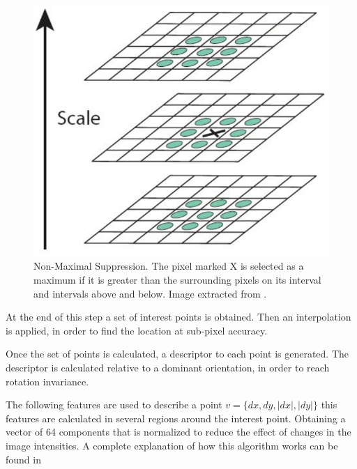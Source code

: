 \begin{figure}[H]
\begin{center}
\includegraphics[scale=0.28]{images/surf_nb}
\caption{Non-Maximal Suppression. The pixel marked X is selected as a maximum if it is greater than the 
surrounding pixels on its interval and intervals above and below. Image extracted from \cite{OpenSURF}.}
\end{center}
\end{figure}

At the end of this step a set of interest points is obtained. Then an interpolation is applied, in order to find the location 
at sub-pixel accuracy.

Once the set of points is calculated, a descriptor to each point is generated. The descriptor is calculated relative to a dominant 
orientation, in order to reach rotation invariance.
 
The following features are used to describe a point $v=\{dx,dy,|dx|,|dy|\}$ this features are calculated in several regions 
around the interest point. Obtaining a vector of 64 components that is normalized to reduce the effect of changes in the image 
intensities. A complete explanation of how this algorithm works can be found in \cite{OpenSURF}


